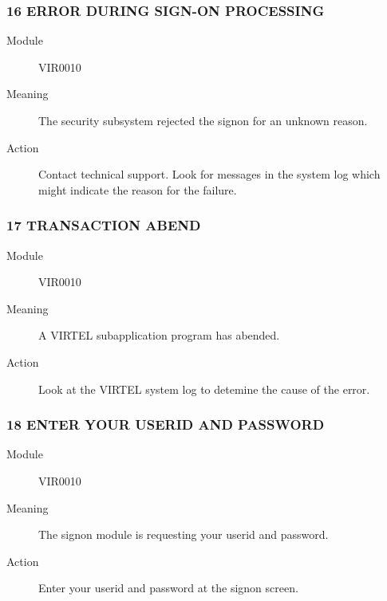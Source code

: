 \documentclass[letterpaper,10pt,english]{sphinxmanual}
\begin{document}
\subsubsection{16 ERROR DURING SIGN-ON PROCESSING}
\label{\detokenize{messages:error-during-sign-on-processing}}\begin{description}
\item[{Module}] \leavevmode
VIR0010

\item[{Meaning}] \leavevmode
The security subsystem rejected the signon for an unknown reason.

\item[{Action}] \leavevmode
Contact technical support. Look for messages in the system log which might indicate the reason for the failure.

\end{description}


\subsubsection{17 TRANSACTION ABEND}
\label{\detokenize{messages:transaction-abend}}\begin{description}
\item[{Module}] \leavevmode
VIR0010

\item[{Meaning}] \leavevmode
A VIRTEL subapplication program has abended.

\item[{Action}] \leavevmode
Look at the VIRTEL system log to detemine the cause of the error.

\end{description}


\subsubsection{18 ENTER YOUR USERID AND PASSWORD}
\label{\detokenize{messages:enter-your-userid-and-password}}\begin{description}
\item[{Module}] \leavevmode
VIR0010

\item[{Meaning}] \leavevmode
The signon module is requesting your userid and password.

\item[{Action}] \leavevmode
Enter your userid and password at the signon screen.

\end{description}
\end{document}
